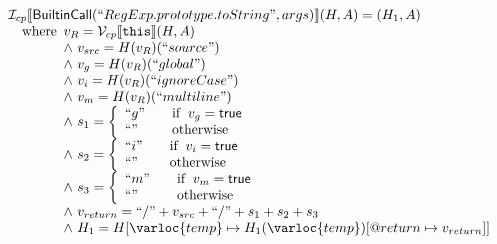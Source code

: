 \[\begin{array}{l}
\I_{cp}\lbr \SF{BuiltinCall}(``RegExp.prototype.toString", args)\rbr(H,A)
= (H_1, A)\\
\quad\wherec{
  v_R = \V _{cp}\lbr \TT{this}\rbr (H,A)\\
  \land~ v_{src} = H(v_R)(``source")\\
  \land~ v_{g} = H(v_R)(``global")\\
  \land~ v_{i} = H(v_R)(``ignoreCase")\\
  \land~ v_{m} = H(v_R)(``multiline")\\
  \land~ s_1 = \left\{
    \begin{array}{ll}
      ``g" & \quad\ifc{v_g = \SF{true}} \\
      ``" & \quad\owc
    \end{array}
  \right.\\
  \land~ s_2 = \left\{
    \begin{array}{ll}
      ``i" & \quad\ifc{v_i = \SF{true}} \\
      ``" & \quad\owc
    \end{array}
  \right.\\
  \land~ s_3 = \left\{
    \begin{array}{ll}
      ``m" & \quad\ifc{v_m = \SF{true}} \\
      ``" & \quad\owc
    \end{array}
  \right.\\
  \land~ v_{return} = ``/" + v_{src} + ``/" + s_1 + s_2 + s_3 \\
   \land~ H_1 = H[\varloc{temp}\mapsto H_1(\varloc{temp})[\varprop{return}\mapsto v_{return}]]
}

\end{array}
\]


